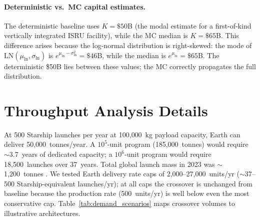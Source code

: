 \documentclass[5p,twocolumn]{elsarticle}
\begin{document}
\paragraph{Deterministic vs.\ MC capital estimates.} The deterministic baseline uses $K = \$50$B (the modal estimate for a first-of-kind vertically integrated ISRU facility), while the MC median is $K = \$65$B. This difference arises because the log-normal distribution is right-skewed: the mode of $\mathrm{LN}(\mu_{\ln}, \sigma_{\ln})$ is $e^{\mu_{\ln} - \sigma_{\ln}^2} = \$46$B, while the median is $e^{\mu_{\ln}} = \$65$B. The deterministic \$50B lies between these values; the MC correctly propagates the full distribution.

\section{Throughput Analysis Details}
\label{sec:appendix_throughput}

At 500 Starship launches per year at 100{,}000~kg payload capacity, Earth can deliver 50{,}000~tonnes/year. A $10^5$-unit program (185{,}000~tonnes) would require $\sim$3.7~years of dedicated capacity; a $10^6$-unit program would require 18{,}500~launches over 37~years. Total global launch mass in 2023 was $\sim$1{,}200~tonnes \cite{jones2022}. We tested Earth delivery rate caps of 2{,}000--27{,}000~units/yr ($\sim$37--500 Starship-equivalent launches/yr); at all caps the crossover is unchanged from baseline because the production rate (500~units/yr) is well below even the most conservative cap. Table~\ref{tab:demand_scenarios} maps crossover volumes to illustrative architectures.

\begin{table}[htbp]
\centering
\caption{Illustrative demand scenarios for 1{,}850~kg structural modules. Mass estimates are order-of-magnitude \cite{jones2022,oneill1976}.}
\label{tab:demand_scenarios}
\small
{}
\end{table}
\end{document}

